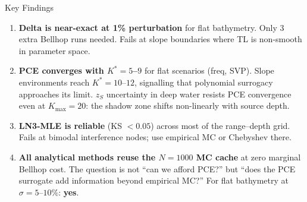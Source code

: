 \documentclass[aspectratio=169,12pt]{beamer}
\begin{document}
\begin{frame}{Key Findings}
  \begin{enumerate}\itemsep10pt
    \item \textbf{Delta is near-exact at 1\% perturbation} for flat bathymetry.
          Only 3 extra Bellhop runs needed.
          Fails at slope boundaries where TL is non-smooth in parameter space.

    \item \textbf{PCE converges with $K^*=5$--$9$} for flat scenarios (freq, SVP).
          Slope environments reach $K^*=10$--$12$, signalling that polynomial
          surrogacy approaches its limit.
          $z_S$ uncertainty in deep water \alert{resists PCE convergence} even at
          $K_{\max}=20$: the shadow zone shifts non-linearly with source depth.

    \item \textbf{LN3-MLE is reliable} (KS $<\!0.05$) across most of the
          range--depth grid.
          Fails at bimodal interference nodes; use empirical MC or Chebyshev there.

    \item \textbf{All analytical methods reuse the $N=1000$ MC cache} at zero
          marginal Bellhop cost.
          The question is not ``can we afford PCE?'' but
          ``\alert{does the PCE surrogate add information beyond empirical MC?}''
          For flat bathymetry at $\sigma=5$--$10\%$: \textbf{yes}.
  \end{enumerate}
\end{frame}
\end{document}
